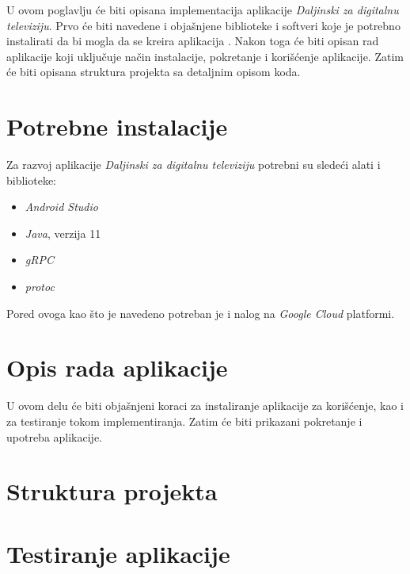 \documentclass[../TamaraIvanovicMasterRad.tex]{subfiles}
\begin{document}
U ovom poglavlju će biti opisana implementacija aplikacije \textit{Daljinski za digitalnu televiziju}. Prvo će biti navedene i objašnjene biblioteke i softveri koje je potrebno instalirati da bi mogla da se kreira aplikacija . Nakon toga će biti opisan rad aplikacije koji uključuje način instalacije, pokretanje i korišćenje aplikacije. Zatim će biti opisana struktura projekta sa detaljnim opisom koda.

\section{Potrebne instalacije} 
Za razvoj aplikacije \textit{Daljinski za digitalnu televiziju} potrebni su sledeći alati i biblioteke:
\begin{itemize}
    \item \textit{Android Studio}
    \item \textit{Java}, verzija 11
    \item \textit{gRPC}
    \item \textit{protoc}
\end{itemize}
Pored ovoga kao što je navedeno potreban je i nalog na \textit{Google Cloud} platformi.
\section{Opis rada aplikacije} \label{opis_rada}
U ovom delu će biti objašnjeni koraci za instaliranje aplikacije za korišćenje, kao i za testiranje tokom implementiranja. Zatim će biti prikazani pokretanje i upotreba aplikacije. 





\section{Struktura projekta}



\section{Testiranje aplikacije}

\end{document}
